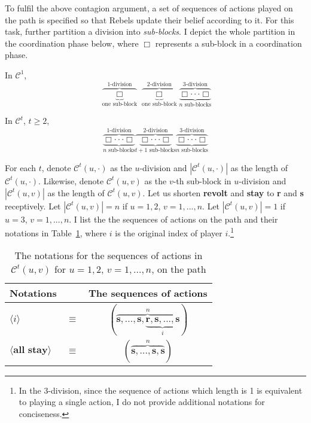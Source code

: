 \documentclass[12pt,letter]{article}
\newcommand{\Kappa}{\mathcal{C}}
\theoremstyle{definition}
\theoremstyle{remark}
\theoremstyle{claim}
\begin{document}
To fulfil the above contagion argument, a set of sequences of actions played on the path is specified so that Rebels update their belief according to it. For this task, further partition a division into \textit{sub-blocks}. I depict the whole partition in the coordination phase below, where $\Box$ represents a sub-block in a coordination phase. 

In $\Kappa^1$, 
\[\overbrace{\underbrace{ \Box }_{\text{one sub-block}}}^{\text{$1$-division}} \overbrace{\underbrace{\Box }_{\text{one sub-block}}}^{\text{$2$-division}} \overbrace{\underbrace{\Box \cdot \cdot \cdot \Box}_{\text{$n$ sub-blocks}}}^{\text{$3$-division}}\] 

In $\Kappa^t$, $t\geq 2$,
\[\overbrace{\underbrace{\Box \cdot \cdot \cdot \Box}_{\text{$n$ sub-blocks}}}^{\text{$1$-division}} \overbrace{\underbrace{\Box \cdot \cdot \cdot \Box}_{\text{$t+1$ sub-blocks}} }^{\text{$2$-division}} \overbrace{\underbrace{\Box \cdot \cdot \cdot \Box}_{\text{$n$ sub-blocks}}}^{\text{$3$-division}}\] 




For each $t$, denote $\Kappa^t(u,\cdot)$ as the $u$-division and $|\Kappa^t(u,\cdot) |$ as the length of $\Kappa^t(u,\cdot)$. Likewise, denote $\Kappa^t(u,v)$ as the $v$-th sub-block in $u$-division and $|\Kappa^t(u,v) |$ as the length of $\Kappa^t(u,v)$. Let us shorten \textbf{revolt} and \textbf{stay} to \textbf{r} and \textbf{s} receptively. Let $|\Kappa^t(u,v)|=n$ if $u=1,2$, $v=1,...,n$. Let $|\Kappa^t(u,v)|=1$ if $u=3$, $v=1,...,n$. I list the the sequences of actions on the path and their notations in Table~\ref{Table_msg_coordination}, where $i$ is the original index of player $i$.\footnote{In the $3$-division, since the sequence of actions which length is 1 is equivalent to playing a single action, I do not provide additional notations for conciseness.}



\begin{table}[!htbp]
\caption{The notations for the sequences of actions in $\Kappa^t(u,v)$ for $u=1,2$, $v=1,...,n$, on the path}
\label{Table_msg_coordination}
\begin{center}
\begin{tabular}{l c c}
Notations & &The sequences of actions \\
\hline
\hline
$\langle i \rangle$ 				& $\equiv$ 			& $(\overbrace{ \textbf{s},...,\textbf{s},\underbrace{\textbf{r},\textbf{s},...,\textbf{s}}_{i}}^{n} )$  \\
$\langle \textbf{all stay} \rangle$	 					& $\equiv$ 			& $( \overbrace{\textbf{s},...,\textbf{s},{\textbf{s}}}^{n} )$  \\
\hline
\end{tabular}
\end{center}
\end{table}
\end{document}
